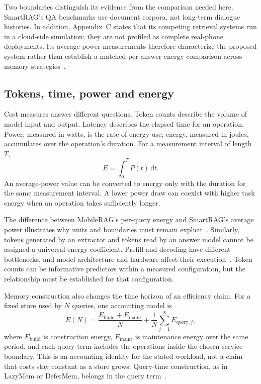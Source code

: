 Two boundaries distinguish its evidence from the comparison needed here. SmartRAG's QA
benchmarks use document corpora, not long-term dialogue histories. In addition,
Appendix~C states that its competing retrieval systems run in a cloud-side simulation;
they are not profiled as complete real-phone deployments. Its average-power measurements
therefore characterize the proposed system rather than establish a matched per-answer
energy comparison across memory strategies~\citep{smartrag}.

\subsection{Tokens, time, power and energy}

Cost measures answer different questions. Token counts describe the volume of model input
and output. Latency describes the elapsed time for an operation. Power, measured in watts,
is the rate of energy use; energy, measured in joules, accumulates over the operation's
duration. For a measurement interval of length $T$,
\begin{equation}
  E=\int_0^T P(t)\,\mathrm{d}t.
  \label{eq:ch2_energy}
\end{equation}
An average-power value can be converted to energy only with the duration for the same
measurement interval. A lower power draw can coexist with higher task energy when an
operation takes sufficiently longer.

The difference between MobileRAG's per-query energy and SmartRAG's average power illustrates
why units and boundaries must remain explicit~\citep{mobilerag_energy,smartrag}. Similarly,
tokens generated by an extractor and tokens read by an answer model cannot be assigned a
universal energy coefficient. Prefill and decoding have different bottlenecks, and model
architecture and hardware affect their execution~\citep{slm_edge_deployment}. Token counts
can be informative predictors within a measured configuration, but the relationship must
be established for that configuration.

Memory construction also changes the time horizon of an efficiency claim. For a fixed
store used by $N$ queries, one accounting model is
\begin{equation}
  \overline{E}(N)=\frac{E_{\mathrm{build}}+E_{\mathrm{maint}}}{N}
  +\frac{1}{N}\sum_{j=1}^{N}E_{\mathrm{query},j},
  \label{eq:ch2_amortization}
\end{equation}
where $E_{\mathrm{build}}$ is construction energy, $E_{\mathrm{maint}}$ is maintenance
energy over the same period, and each query term includes the operations inside the chosen
service boundary. This is an accounting identity for the stated workload, not a claim
that costs stay constant as a store grows. Query-time construction, as in LazyMem or
DeferMem, belongs in the query term~\citep{lazymem,defermem}.


